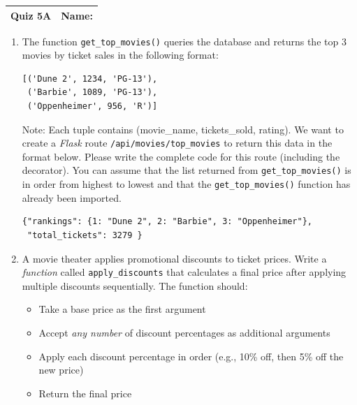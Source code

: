 \documentclass[11pt]{article}
\begin{document}
\clearpage

\begin{tabularx}{\textwidth}{l|X}
\textbf{Quiz 5A} &   \textbf{Name: } \\
\hline
\end{tabularx}


\begin{enumerate}

\item The function \texttt{get\_top\_movies()} queries the database and returns the top 3 movies by ticket sales in the following format:

\begin{verbatim}
[('Dune 2', 1234, 'PG-13'), 
 ('Barbie', 1089, 'PG-13'), 
 ('Oppenheimer', 956, 'R')]
\end{verbatim}

Note: Each tuple contains (movie\_name, tickets\_sold, rating). We want to create a \emph{Flask} route \texttt{/api/movies/top\_movies} to return this data in the format below. Please write the complete code for this route (including the decorator). You can assume that the list returned from \texttt{get\_top\_movies()} is in order from highest to lowest and that the \texttt{get\_top\_movies()} function has already been imported.

\begin{verbatim}
{"rankings": {1: "Dune 2", 2: "Barbie", 3: "Oppenheimer"},
 "total_tickets": 3279 }
\end{verbatim}


\vspace{6cm}

\item A movie theater applies promotional discounts to ticket prices. Write a \emph{function} called \texttt{apply\_discounts} that calculates a final price after applying multiple discounts sequentially. The function should:
\begin{itemize}
    \item Take a base price as the first argument
    \item Accept {\it any number} of discount percentages as additional arguments
    \item Apply each discount percentage in order (e.g., 10\% off, then 5\% off the new price)
    \item Return the final price
\end{itemize}


\end{enumerate}
\end{document}
